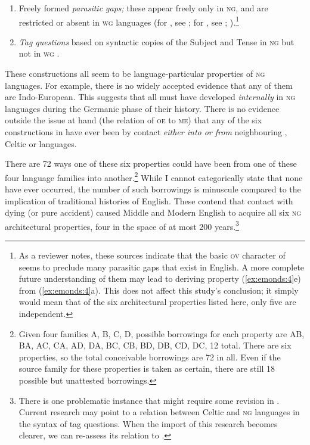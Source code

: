 \documentclass[output=paper]{LSP/langsci}
\begin{document}
\begin{enumerate}[label={(\alph*)}]
\item Freely formed \textit{parasitic gaps;} these appear freely only in \textsc{ng}, and are restricted or absent in \textsc{wg} languages (for , see \citealt{Kathol2001}; for , see \citealt{Bennis1985}; \citealt[6.4]{EmondsFaarlund2014} ).\footnote{As a reviewer notes, these sources indicate that the basic \textsc{ov} character of  seems to preclude many parasitic gaps that exist in English. A more complete future understanding of them may lead to deriving property (\ref{ex:emonds:4}e) from (\ref{ex:emonds:4}a). This does not affect this study’s conclusion; it simply would mean that of the six architectural properties listed here, only five are independent.} 
\item \textit{Tag questions} based on syntactic copies of the Subject and Tense in \textsc{ng} but not in \textsc{wg} \citep[6.5]{EmondsFaarlund2014}.
\end{enumerate}
\z

These constructions all seem to be language-particular properties of \textsc{ng} languages. For example, there is no widely accepted evidence that any of them are Indo-European. This suggests that all must have developed \textit{internally} in \textsc{ng} languages during the Germanic {phase} of their history.  There is no evidence outside the issue at hand (the relation of \textsc{oe} to \textsc{me}) that any of the six constructions in  have ever been  by contact \textit{either into or from} neighbouring , Celtic or  languages.

There are 72 ways one of these six properties could have been  from one of these four language families into another.\footnote{Given four families A, B, C, D, possible borrowings for each property are A\textrightarrow B, B\textrightarrow A, A\textrightarrow C, C\textrightarrow A, A\textrightarrow D, D\textrightarrow A, B\textrightarrow C, C\textrightarrow B, B\textrightarrow D, D\textrightarrow B, C\textrightarrow D, D\textrightarrow C, 12 total. There are six properties, so the total conceivable borrowings are 72 in all. Even if the source family for these properties is taken as certain, there are still 18 possible but unattested borrowings.} While I cannot categorically state that none have ever occurred, the number of such borrowings is minuscule compared to the implication of traditional histories of English. These contend that contact with dying  (or pure accident) caused Middle and Modern English to acquire all six \textsc{ng} architectural properties, four in the space of at most 200 years.\footnote{There is one problematic instance that might require some revision in . Current research may point to a relation between Celtic and \textsc{ng} languages in the syntax of tag questions. When the import of this research becomes clearer, we can re-assess its relation to .}
\end{document}
